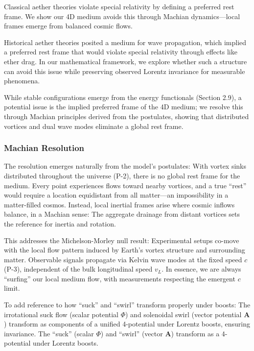 Classical aether theories violate special relativity by defining a preferred rest frame. We show our 4D medium avoids this through Machian dynamics---local frames emerge from balanced cosmic flows.

Historical aether theories posited a medium for wave propagation, which implied a preferred rest frame that would violate special relativity through effects like ether drag. In our mathematical framework, we explore whether such a structure can avoid this issue while preserving observed Lorentz invariance for measurable phenomena.

While stable configurations emerge from the energy functionals (Section 2.9), a potential issue is the implied preferred frame of the 4D medium; we resolve this through Machian principles derived from the postulates, showing that distributed vortices and dual wave modes eliminate a global rest frame.

\subsubsection{Machian Resolution}

The resolution emerges naturally from the model's postulates: With vortex sinks distributed throughout the universe (P-2), there is no global rest frame for the medium. Every point experiences flows toward nearby vortices, and a true ``rest'' would require a location equidistant from all matter---an impossibility in a matter-filled cosmos. Instead, local inertial frames arise where cosmic inflows balance, in a Machian sense: The aggregate drainage from distant vortices sets the reference for inertia and rotation.

This addresses the Michelson-Morley null result: Experimental setups co-move with the local flow pattern induced by Earth's vortex structure and surrounding matter. Observable signals propagate via Kelvin wave modes at the fixed speed $c$ (P-3), independent of the bulk longitudinal speed $v_L$. In essence, we are always ``surfing'' our local medium flow, with measurements respecting the emergent $c$ limit.

To add reference to how ``suck'' and ``swirl'' transform properly under boosts: The irrotational suck flow (scalar potential $\Phi$) and solenoidal swirl (vector potential $\mathbf{A}$) transform as components of a unified 4-potential under Lorentz boosts, ensuring invariance. The ``suck'' (scalar $\Phi$) and ``swirl'' (vector $\mathbf{A}$) transform as a 4-potential under Lorentz boosts.

